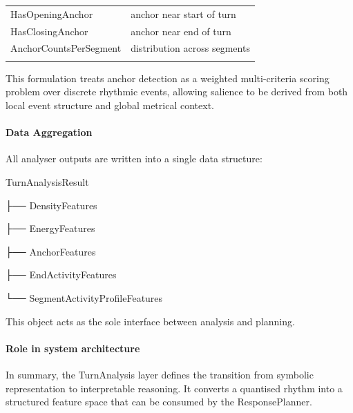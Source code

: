 {\begin{longtable}[]{@{}
  >{\raggedright\arraybackslash}p{}
  >{\raggedright\arraybackslash}p{}@{}}
\begin{minipage}[b]{\linewidth}
HasOpeningAnchor
\end{minipage} & \begin{minipage}[b]{\linewidth}\raggedright
anchor near start of turn
\end{minipage} \\
\begin{minipage}[b]{\linewidth}\raggedright
HasClosingAnchor
\end{minipage} & \begin{minipage}[b]{\linewidth}\raggedright
anchor near end of turn
\end{minipage} \\
\begin{minipage}[b]{\linewidth}\raggedright
AnchorCountsPerSegment
\end{minipage} & \begin{minipage}[b]{\linewidth}\raggedright
distribution across segments
\end{minipage} \\
\midrule\noalign{}
\endhead
\bottomrule\noalign{}
\endlastfoot
\end{longtable}
}

This formulation treats anchor detection as a weighted multi-criteria
scoring problem over discrete rhythmic events, allowing salience to be
derived from both local event structure and global metrical context.

\paragraph{Data Aggregation}\label{data-aggregation}

All analyser outputs are written into a single data structure:

TurnAnalysisResult

├── DensityFeatures

├── EnergyFeatures

├── AnchorFeatures

├── EndActivityFeatures

└── SegmentActivityProfileFeatures

This object acts as the sole interface between analysis and planning.

\paragraph{Role in system
architecture}\label{role-in-system-architecture-3}

In summary, the TurnAnalysis layer defines the transition from symbolic
representation to interpretable reasoning. It converts a quantised
rhythm into a structured feature space that can be consumed by the
ResponsePlanner.

